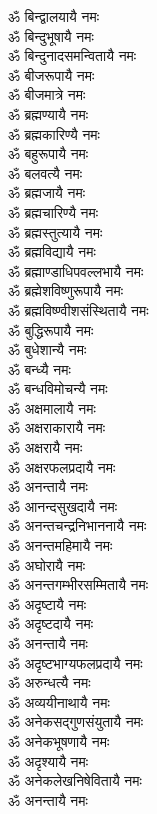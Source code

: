 \begin{flushleft}
\begin{multicols}{2}
ॐ बिन्द्वालयायै नमः\\
ॐ बिन्दुभूषायै नमः\\
ॐ बिन्दुनादसमन्वितायै नमः\\
ॐ बीजरूपायै नमः\\
ॐ बीजमात्रे नमः\\
ॐ ब्रह्मण्यायै नमः\\
ॐ ब्रह्मकारिण्यै नमः\\
ॐ बहुरूपायै नमः\\
ॐ बलवत्यै नमः\hfill{}\\
ॐ ब्रह्मजायै नमः\\
ॐ ब्रह्मचारिण्यै नमः\\
ॐ ब्रह्मस्तुत्यायै नमः\\
ॐ ब्रह्मविद्यायै नमः\\
ॐ ब्रह्माण्डाधिपवल्लभायै नमः\\
ॐ ब्रह्मेशविष्णुरूपायै नमः\\
ॐ ब्रह्मविष्ण्वीशसंस्थितायै नमः\\
ॐ बुद्धिरूपायै नमः\\
ॐ बुधेशान्यै नमः\\
ॐ बन्ध्यै नमः\hfill{}\\
ॐ बन्धविमोचन्यै नमः\\
ॐ अक्षमालायै नमः\\
ॐ अक्षराकारायै नमः\\
ॐ अक्षरायै नमः\\
ॐ अक्षरफलप्रदायै नमः\\
ॐ अनन्तायै नमः\\
ॐ आनन्दसुखदायै नमः\\
ॐ अनन्तचन्द्रनिभाननायै नमः\\
ॐ अनन्तमहिमायै नमः\\
ॐ अघोरायै नमः\hfill{}\\
ॐ अनन्तगम्भीरसम्मितायै नमः\\
ॐ अदृष्टायै नमः\\
ॐ अदृष्टदायै नमः\\
ॐ अनन्तायै नमः\\
ॐ अदृष्टभाग्यफलप्रदायै नमः\\
ॐ अरुन्धत्यै नमः\\
ॐ अव्ययीनाथायै नमः\\
ॐ अनेकसद्गुणसंयुतायै नमः\\
ॐ अनेकभूषणायै नमः\\
ॐ अदृश्यायै नमः\hfill{}\\
ॐ अनेकलेखनिषेवितायै नमः\\
ॐ अनन्तायै नमः\\

\end{multicols}
\end{flushleft}
